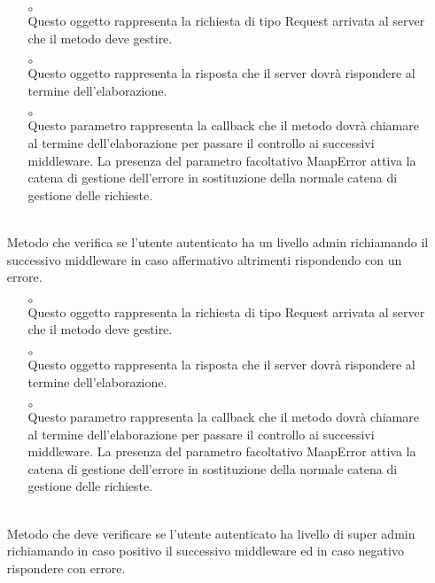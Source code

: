 \begin{itemize}
\begin{itemize}\addtolength{\itemsep}{-0.5\baselineskip}
\item[$\circ$]  \\ Questo oggetto rappresenta la richiesta di tipo Request arrivata al server che il metodo deve gestire.
\item[$\circ$]  \\ Questo oggetto rappresenta la risposta che il server dovrà rispondere al termine dell'elaborazione.
\item[$\circ$]  \\ Questo parametro rappresenta la callback che il metodo dovrà chiamare al termine dell'elaborazione per passare il controllo ai successivi middleware. La presenza del parametro facoltativo MaapError attiva la catena di gestione dell'errore in sostituzione della normale catena di gestione delle richieste.
\end{itemize}
\item[]  \\ Metodo che verifica se l'utente autenticato ha un livello admin richiamando il successivo middleware in caso affermativo altrimenti rispondendo con un errore.
\begin{itemize}\addtolength{\itemsep}{-0.5\baselineskip}
\item[$\circ$]  \\ Questo oggetto rappresenta la richiesta di tipo Request arrivata al server che il metodo deve gestire.
\item[$\circ$]  \\ Questo oggetto rappresenta la risposta che il server dovrà rispondere al termine dell'elaborazione.
\item[$\circ$]  \\ Questo parametro rappresenta la callback che il metodo dovrà chiamare al termine dell'elaborazione per passare il controllo ai successivi middleware. La presenza del parametro facoltativo MaapError attiva la catena di gestione dell'errore in sostituzione della normale catena di gestione delle richieste.
\end{itemize}
\item[]  \\ Metodo che deve verificare se l'utente autenticato ha livello di super admin richiamando in caso positivo il successivo middleware ed in caso negativo rispondere con errore.

\end{itemize}
